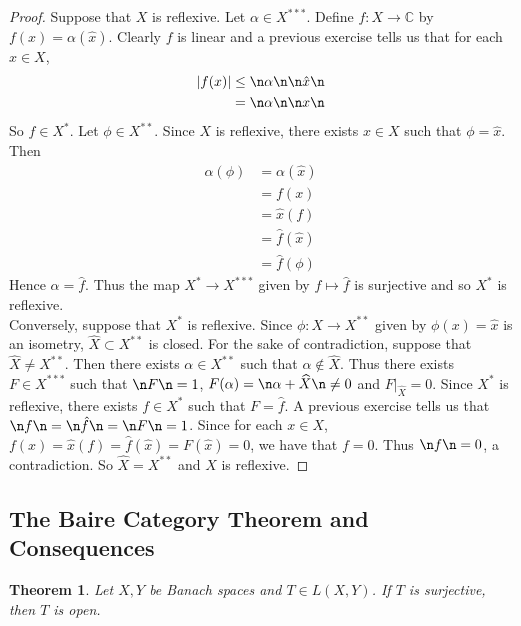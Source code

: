 \documentclass[12pt]{amsart}
\newtheorem{thm}{Theorem}[subsection]
\newcommand{\al}{\alpha}
\newcommand{\C}{\mathbb{C}}
\begin{document}
\begin{proof}
	Suppose that $X$ is reflexive. Let $\al \in X^{***}$. Define $f :X \rightarrow \C$ by $f(x) = \al(\hat{x})$. Clearly $f$ is linear and a previous exercise tells us that for each $x \in X$, 
	\begin{align*}
		\vert f(x) \vert 
		& \leq \n \al \n \n \hat{x} \n\\
		&= \n \al \n \n x \n
	\end{align*}
	So $f \in X^*$.
	Let $\phi \in X^{**}$. Since $X$ is reflexive, there exists $x \in X$ such that $\phi = \hat{x}$. Then 
	\begin{align*}
		\al(\phi)
		&= \al(\hat{x})\\
		&= f(x)\\
		&= \hat{x}(f)\\
		&= \hat{f}(\hat{x})\\
		&= \hat{f}(\phi)
	\end{align*}
	Hence $\al = \hat{f}$. Thus the map $X^* \rightarrow X^{***}$ given by $f \mapsto \hat{f} $ is surjective and so $X^{*}$ is reflexive.\vspace{.5cm}\\
	Conversely, suppose that $X^*$ is reflexive. Since $\phi:X \rightarrow X^{**}$ given by $\phi(x) = \hat{x}$ is an isometry, $\widehat{X} \subset X^{**}$ is closed. For the sake of contradiction, suppose that $\widehat{X} \neq X^{**}$. Then there exists $\al \in X^{**}$ such that $\al \not \in \widehat{X}$. Thus there exists $F \in X^{***}$ such that $\n F \n = 1$, $F(\al) = \n \al + \widehat{X} \n \neq 0$ and $F|_{\widehat{X}}=0$. Since $X^*$ is reflexive, there exists $f \in X^*$ such that $F = \hat{f}$. A previous exercise tells us that $\n f \n = \n \hat{f} \n = \n F \n = 1$. Since for each $x \in X$, $f(x) = \hat{x}(f) = \hat{f}(\hat{x}) = F(\hat{x}) = 0$, we have that $f = 0$. Thus $\n f \n = 0$, a contradiction. So $\widehat{X} = X^{**}$ and $X$ is reflexive.
	
\end{proof}

\subsection{The Baire Category Theorem and Consequences}

\begin{thm}
	Let $X, Y$ be Banach spaces and $T\in L(X,Y)$. If $T$ is surjective, then $T$ is open.
\end{thm}
\end{document}
